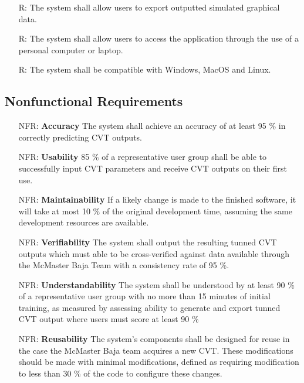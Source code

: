 \documentclass[12pt]{article}
\newcounter{reqnum} %
\newcounter{nfrnum} %
\begin{document}
\begin{itemize}
\item[R\refstepcounter{reqnum}\thereqnum \label{R_Inputs}:] The system shall allow users to export outputted simulated graphical data.

\item[R\refstepcounter{reqnum}\thereqnum \label{R_Inputs}:] The system shall allow users to access the application through the use of a personal computer or laptop.

\item[R\refstepcounter{reqnum}\thereqnum \label{R_Inputs}:] The system shall be compatible with Windows, MacOS and Linux.
\end{itemize}

\subsection{Nonfunctional Requirements}

\noindent \begin{itemize}

\item[NFR\refstepcounter{nfrnum}\thenfrnum \label{NFR_Accuracy}:]\textbf{Accuracy} The system shall achieve an accuracy of at least 95 \% in correctly predicting CVT outputs.
\item[NFR\refstepcounter{nfrnum}\thenfrnum \label{NFR_Usability}:] \textbf{Usability} 85 \% of a representative user group shall be able to successfully input CVT parameters and receive CVT outputs on their first use.
\item[NFR\refstepcounter{nfrnum}\thenfrnum \label{NFR_Maintainability}:]\textbf{Maintainability} If a likely change is made to the finished software, it will take at most 10 \% of the original development time, assuming the same development resources are available.
\item[NFR\refstepcounter{nfrnum}\thenfrnum \label{NFR_Verifiability}:] \textbf{Verifiability} The system shall output the resulting tunned CVT outputs which must able to be cross-verified against data available through the McMaster Baja Team with a consistency rate of 95 \%.
\item[NFR\refstepcounter{nfrnum}\thenfrnum \label{NFR_Understandability}:] \textbf{Understandability} The system shall be understood by at least 90 \% of a representative user group with no more than 15 minutes of initial training, as measured by assessing ability to generate and export tunned CVT output where users must score at least 90 \%
\item[NFR\refstepcounter{nfrnum}\thenfrnum \label{NFR_Reusability}:] \textbf{Reusability} The system's components shall be designed for reuse in the case the McMaster Baja team acquires a new CVT. These modifications should be made with minimal modifications, defined as requiring modification to less than 30 \% of the code to configure these changes.

\end{itemize}
\end{document}
